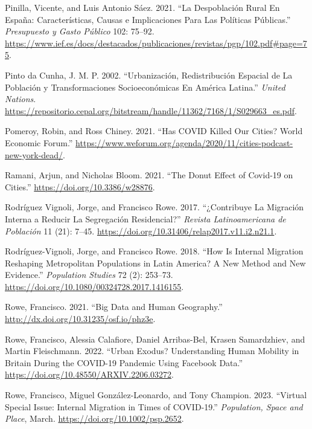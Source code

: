 \documentclass[11pt,letterpaper]{article}
\newlength{\cslhangindent}
\newlength{\cslentryspacingunit} %
\newenvironment{CSLReferences}[2] %
 {%
  \setlength{\parindent}{0pt}
  \ifodd #1
  \let\oldpar\par
  \def\par{\hangindent=\cslhangindent\oldpar}
  \fi
  \setlength{\parskip}{#2\cslentryspacingunit}
 }%
 {}
\begin{document}
\begin{CSLReferences}{1}{0}
Pinilla, Vicente, and Luis Antonio Sáez. 2021. {``La Despoblación Rural
En España: Características, Causas e Implicaciones Para Las Políticas
Públicas.''} \emph{Presupuesto y Gasto Público} 102: 75--92.
\url{https://www.ief.es/docs/destacados/publicaciones/revistas/pgp/102.pdf\#page=75}.

Pinto da Cunha, J. M. P. 2002. {``Urbanización, Redistribución Espacial
de La Población y Transformaciones Socioeconómicas En América Latina.''}
\emph{United Nations}.
\url{https://repositorio.cepal.org/bitstream/handle/11362/7168/1/S029663_es.pdf}.

Pomeroy, Robin, and Ross Chiney. 2021. {``Has COVID Killed Our Cities?
World Economic Forum.''}
\url{https://www.weforum.org/agenda/2020/11/cities-podcast-new-york-dead/}.

Ramani, Arjun, and Nicholas Bloom. 2021. {``The Donut Effect of Covid-19
on Cities.''} \url{https://doi.org/10.3386/w28876}.

Rodríguez Vignoli, Jorge, and Francisco Rowe. 2017. {``¿Contribuye La
Migración Interna a Reducir La Segregación Residencial?''} \emph{Revista
Latinoamericana de Población} 11 (21): 7--45.
\url{https://doi.org/10.31406/relap2017.v11.i2.n21.1}.

Rodríguez-Vignoli, Jorge, and Francisco Rowe. 2018. {``How Is Internal
Migration Reshaping Metropolitan Populations in Latin America? A New
Method and New Evidence.''} \emph{Population Studies} 72 (2): 253--73.
\url{https://doi.org/10.1080/00324728.2017.1416155}.

Rowe, Francisco. 2021. {``Big Data and Human Geography.''}
\url{http://dx.doi.org/10.31235/osf.io/phz3e}.

Rowe, Francisco, Alessia Calafiore, Daniel Arribas-Bel, Krasen
Samardzhiev, and Martin Fleischmann. 2022. {``Urban Exodus?
Understanding Human Mobility in Britain During the COVID-19 Pandemic
Using Facebook Data.''} \url{https://doi.org/10.48550/ARXIV.2206.03272}.

Rowe, Francisco, Miguel González-Leonardo, and Tony Champion. 2023.
{``Virtual Special Issue: Internal Migration in Times of COVID{-}19.''}
\emph{Population, Space and Place}, March.
\url{https://doi.org/10.1002/psp.2652}.


\end{CSLReferences}
\end{document}
